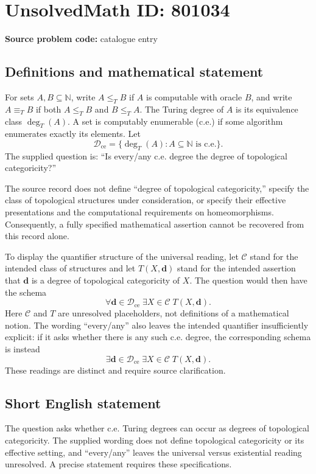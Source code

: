 \documentclass[11pt]{article}
\newcommand{\N}{\mathbb{N}}
\begin{document}
\section*{UnsolvedMath ID: 801034}
\textbf{Source problem code:} catalogue entry
\subsection{Definitions and mathematical statement}
For sets \(A,B\subseteq\N\), write \(A\leq_T B\) if \(A\) is computable with oracle \(B\), and write \(A\equiv_T B\) if both \(A\leq_T B\) and \(B\leq_T A\). The Turing degree of \(A\) is its equivalence class \(\deg_T(A)\). A set is computably enumerable (c.e.) if some algorithm enumerates exactly its elements. Let
\[
\mathcal D_{\mathrm{ce}}=\{\deg_T(A):A\subseteq\N\text{ is c.e.}\}.
\]
The supplied question is: ``Is every/any c.e. degree the degree of topological categoricity?''

The source record does not define ``degree of topological categoricity,'' specify the class of topological structures under consideration, or specify their effective presentations and the computational requirements on homeomorphisms. Consequently, a fully specified mathematical assertion cannot be recovered from this record alone.

To display the quantifier structure of the universal reading, let \(\mathcal C\) stand for the intended class of structures and let \(T(X,\mathbf d)\) stand for the intended assertion that \(\mathbf d\) is a degree of topological categoricity of \(X\). The question would then have the schema
\[
\forall\mathbf d\in\mathcal D_{\mathrm{ce}}\;\exists X\in\mathcal C\;T(X,\mathbf d).
\]
Here \(\mathcal C\) and \(T\) are unresolved placeholders, not definitions of a mathematical notion. The wording ``every/any'' also leaves the intended quantifier insufficiently explicit: if it asks whether there is any such c.e. degree, the corresponding schema is instead
\[
\exists\mathbf d\in\mathcal D_{\mathrm{ce}}\;\exists X\in\mathcal C\;T(X,\mathbf d).
\]
These readings are distinct and require source clarification.
\subsection{Short English statement}
The question asks whether c.e. Turing degrees can occur as degrees of topological categoricity. The supplied wording does not define topological categoricity or its effective setting, and ``every/any'' leaves the universal versus existential reading unresolved. A precise statement requires these specifications.
\end{document}
